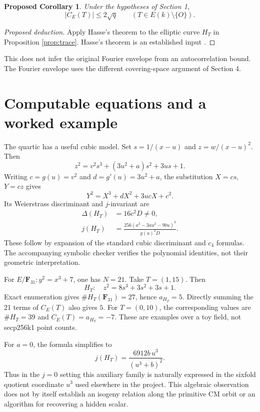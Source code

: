 \documentclass[11pt,a4paper]{article}
\numberwithin{equation}{section}
\newtheorem{cor}[prop]{Proposed Corollary}
\newcommand{\F}{\mathbf F}
\begin{document}
\begin{cor}\label{cor:bound}
Under the hypotheses of Section 1,
\begin{equation}\label{eq:autobound}
 |C_E(T)|\le2\sqrt q\qquad(T\in E(k)\setminus\{O\}).
\end{equation}
\end{cor}
\begin{proof}[Proposed deduction]
Apply Hasse's theorem to the elliptic curve $H_T$ in Proposition \ref{prop:trace}. Hasse's theorem is an established input \cite[Theorem 7.3]{Sutherland}.
\end{proof}
This does not infer the original Fourier envelope from an autocorrelation bound. The Fourier envelope uses the different covering-space argument of Section 4.

\section{Computable equations and a worked example}
The quartic has a useful cubic model. Set $s=1/(x-u)$ and $z=w/(x-u)^2$. Then
\begin{equation}\label{eq:cubic}
 z^2=v^2s^3+(3u^2+a)s^2+3us+1.
\end{equation}
Writing $c=g(u)=v^2$ and $d=g'(u)=3u^2+a$, the substitution $X=cs$, $Y=cz$ gives
\begin{equation}\label{eq:monic}
 Y^2=X^3+dX^2+3ucX+c^2.
\end{equation}
Its Weierstrass discriminant and $j$-invariant are
\begin{align}\label{eq:discriminant}
 \Delta(H_T)&=16c^2D\ne0,\\
 j(H_T)&=\frac{256(a^2-3au^2-9bu)^3}{g(u)^2D}.
\end{align}
These follow by expansion of the standard cubic discriminant and $c_4$ formulas. The accompanying symbolic checker verifies the polynomial identities, not their geometric interpretation.

For $E/\F_{31}:y^2=x^3+7$, one has $N=21$. Take $T=(1,15)$. Then
\begin{equation}
 H_T:\quad z^2=8s^3+3s^2+3s+1.
\end{equation}
Exact enumeration gives $\#H_T(\F_{31})=27$, hence $a_{H_T}=5$. Directly summing the 21 terms of $C_E(T)$ also gives $5$. For $T=(0,10)$, the corresponding values are $\#H_T=39$ and $C_E(T)=a_{H_T}=-7$. These are examples over a toy field, not secp256k1 point counts.

For $a=0$, the formula simplifies to
\begin{equation}\label{eq:cmj}
 j(H_T)=\frac{6912b\,u^3}{(u^3+b)^2}.
\end{equation}
Thus in the $j=0$ setting this auxiliary family is naturally expressed in the sixfold quotient coordinate $u^3$ used elsewhere in the project. This algebraic observation does not by itself establish an isogeny relation along the primitive CM orbit or an algorithm for recovering a hidden scalar.
\end{document}
